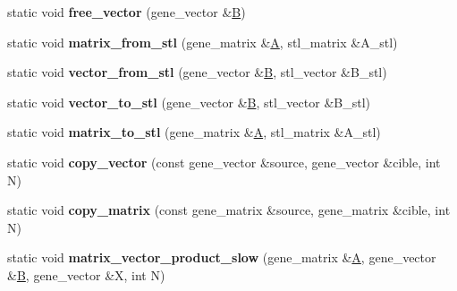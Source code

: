 \begin{DoxyCompactItemize}
static void {\bfseries free\+\_\+vector} (gene\+\_\+vector \&\hyperlink{group___core___module_class_eigen_1_1_matrix}{B})
\item 
\mbox{\label{classublas__interface_a86c456f8a172a6d7bae92181bd57962b}} 
static void {\bfseries matrix\+\_\+from\+\_\+stl} (gene\+\_\+matrix \&\hyperlink{group___core___module_class_eigen_1_1_matrix}{A}, stl\+\_\+matrix \&A\+\_\+stl)
\item 
\mbox{\label{classublas__interface_a0a5a4f40ad048be8c066438f1f77ea5f}} 
static void {\bfseries vector\+\_\+from\+\_\+stl} (gene\+\_\+vector \&\hyperlink{group___core___module_class_eigen_1_1_matrix}{B}, stl\+\_\+vector \&B\+\_\+stl)
\item 
\mbox{\label{classublas__interface_a8b52f77a0ed244e5b7a7604120e84fc1}} 
static void {\bfseries vector\+\_\+to\+\_\+stl} (gene\+\_\+vector \&\hyperlink{group___core___module_class_eigen_1_1_matrix}{B}, stl\+\_\+vector \&B\+\_\+stl)
\item 
\mbox{\label{classublas__interface_af36a6f033d5fa349ccb3a116f161d524}} 
static void {\bfseries matrix\+\_\+to\+\_\+stl} (gene\+\_\+matrix \&\hyperlink{group___core___module_class_eigen_1_1_matrix}{A}, stl\+\_\+matrix \&A\+\_\+stl)
\item 
\mbox{\label{classublas__interface_a03447fe23509848cc3d84d6bb5dcad86}} 
static void {\bfseries copy\+\_\+vector} (const gene\+\_\+vector \&source, gene\+\_\+vector \&cible, int N)
\item 
\mbox{\label{classublas__interface_ab6feace7a007b3344072623229d3f738}} 
static void {\bfseries copy\+\_\+matrix} (const gene\+\_\+matrix \&source, gene\+\_\+matrix \&cible, int N)
\item 
\mbox{\label{classublas__interface_a858ac339249e698a4a6d9fb8b63765d3}} 
static void {\bfseries matrix\+\_\+vector\+\_\+product\+\_\+slow} (gene\+\_\+matrix \&\hyperlink{group___core___module_class_eigen_1_1_matrix}{A}, gene\+\_\+vector \&\hyperlink{group___core___module_class_eigen_1_1_matrix}{B}, gene\+\_\+vector \&X, int N)
\item 
\mbox{\label{classublas__interface_a0d59e21440e6b229c42871dcb6ab60ba}} 

\end{DoxyCompactItemize}
